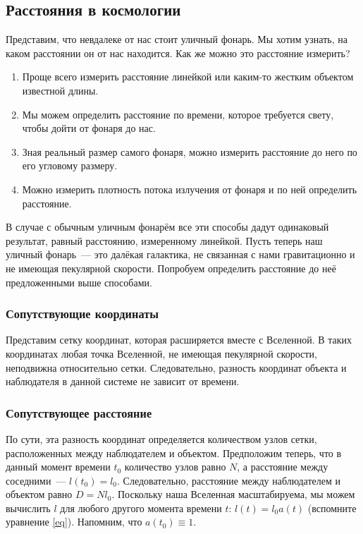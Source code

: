 
\subsection{Расстояния в космологии}
Представим, что невдалеке от нас стоит уличный фонарь. Мы хотим узнать, на каком расстоянии он от нас находится. Как же можно это расстояние измерить?
\begin{enumerate}
\item Проще всего измерить расстояние линейкой или каким-то жестким объектом известной длины.
\item Мы можем определить расстояние по времени, которое требуется свету, чтобы дойти от фонаря до нас.
\item Зная реальный размер самого фонаря, можно измерить расстояние до него по его угловому размеру.
\item Можно измерить плотность потока излучения от фонаря и по ней определить расстояние.
\end{enumerate}
В случае с обычным уличным фонарём все эти способы дадут одинаковый результат, равный расстоянию, измеренному линейкой. Пусть теперь наш уличный фонарь~--- это далёкая галактика, не связанная с нами гравитационно и не имеющая пекулярной скорости. Попробуем определить расстояние до неё предложенными выше способами.

\subsubsection{Сопутствующие координаты}
Представим сетку координат, которая расширяется вместе с Вселенной. В таких координатах любая точка Вселенной, не имеющая пекулярной скорости, неподвижна относительно сетки. Следовательно, разность координат объекта и наблюдателя в данной системе не зависит от времени.

\subsubsection*{Сопутствующее расстояние}
По сути, эта разность координат определяется количеством узлов сетки, расположенных между наблюдателем и объектом. Предположим теперь, что в данный момент времени $t_0$ количество узлов равно $N$, а расстояние между соседними~--- $l(t_0) = l_0.$ Следовательно, расстояние между наблюдателем и объектом равно $D = N l_0.$ Поскольку наша Вселенная масштабируема, мы можем вычислить $l$ для любого другого момента времени $t$: $l(t) = l_0 a(t)$ (вспомните уравнение \eqref{eq}). Напомним, что $a(t_0) \equiv 1.$ 

